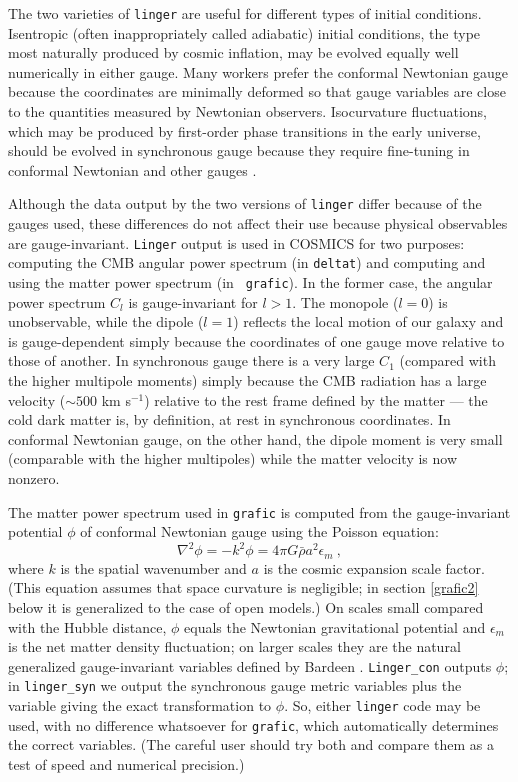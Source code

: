 The two varieties of {\tt linger} are useful for different types of initial
conditions.  Isentropic (often inappropriately called adiabatic) initial
conditions, the type most naturally produced by cosmic inflation, may be
evolved equally well numerically in either gauge.  Many workers prefer the
conformal Newtonian gauge because the coordinates are minimally deformed
so that gauge variables are close to the quantities measured by Newtonian
observers.  Isocurvature fluctuations, which may be produced by first-order
phase transitions in the early universe, should be evolved in synchronous
gauge because they require fine-tuning in conformal Newtonian and other
gauges \cite{b80}.

Although the data output by the two versions of {\tt linger} differ because
of the gauges used, these differences do not affect their use because
physical observables are gauge-invariant.  {\tt Linger} output is used in
COSMICS for two purposes: computing the CMB angular power spectrum (in
{\tt deltat}) and computing and using the matter power spectrum (in {\tt
grafic}).  In the former case, the angular power spectrum $C_l$ is
gauge-invariant for $l>1$.  The monopole ($l=0$) is unobservable, while
the dipole ($l=1$) reflects the local motion of our galaxy and is
gauge-dependent simply because the coordinates of one gauge move relative
to those of another.  In synchronous gauge there is a very large $C_1$
(compared with the higher multipole moments) simply because the CMB
radiation has a large velocity ($\sim 500$ km s$^{-1}$) relative to the
rest frame defined by the matter --- the cold dark matter is, by definition,
at rest in synchronous coordinates.  In conformal Newtonian gauge, on
the other hand, the dipole moment is very small (comparable with the
higher multipoles) while the matter velocity is now nonzero.

The matter power spectrum used in {\tt grafic} is computed from the
gauge-invariant potential $\phi$ of conformal Newtonian gauge using the
Poisson equation:
\begin{equation}
\label{poisson}
\nabla^2\phi=-k^2\phi=4\pi G\bar\rho a^2\epsilon_m\ ,
\end{equation}
where $k$ is the spatial wavenumber and $a$ is the cosmic expansion
scale factor.  (This equation assumes that space curvature is negligible;
in section \ref{grafic2} below it is generalized to the case of open
models.)  On scales small compared with the Hubble distance, $\phi$
equals the Newtonian gravitational potential and $\epsilon_m$ is the net
matter density fluctuation; on larger scales they are the natural
generalized gauge-invariant variables defined by Bardeen \cite{b80}.
{\tt Linger\_con} outputs $\phi$; in {\tt linger\_syn} we output the
synchronous gauge metric variables plus the variable giving the exact
transformation to $\phi$.  So, either {\tt linger} code may be used, with
no difference whatsoever for {\tt grafic}, which automatically determines
the correct variables.  (The careful user should try both and compare them
as a test of speed and numerical precision.)

